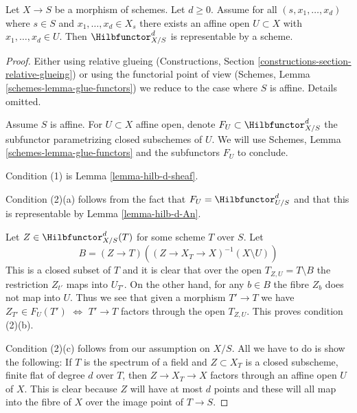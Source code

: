 \begin{proposition}
\label{proposition-hilb-d-representable}
Let $X \to S$ be a morphism of schemes. Let $d \geq 0$. Assume
for all $(s, x_1, \ldots, x_d)$ where $s \in S$ and
$x_1, \ldots, x_d \in X_s$ there exists an affine open $U \subset X$
with $x_1, \ldots, x_d \in U$. Then $\Hilbfunctor^d_{X/S}$ is
representable by a scheme.
\end{proposition}

\begin{proof}
Either using relative glueing (Constructions, Section
\ref{constructions-section-relative-glueing}) or using
the functorial point of view
(Schemes, Lemma \ref{schemes-lemma-glue-functors})
we reduce to the case where $S$ is affine. Details omitted.

\medskip\noindent
Assume $S$ is affine. For $U \subset X$ affine open, denote
$F_U \subset \Hilbfunctor^d_{X/S}$ the subfunctor parametrizing
closed subschemes of $U$. We will use
Schemes, Lemma \ref{schemes-lemma-glue-functors}
and the subfunctors $F_U$ to conclude.

\medskip\noindent
Condition (1) is Lemma \ref{lemma-hilb-d-sheaf}.

\medskip\noindent
Condition (2)(a) follows from the fact that
$F_U = \Hilbfunctor^d_{U/S}$ and that this is representable
by Lemma \ref{lemma-hilb-d-An}.

\medskip\noindent
Let $Z \in \Hilbfunctor^d_{X/S}(T)$ for some scheme $T$ over $S$. Let
$$
B = (Z \to T)\left((Z \to X_T \to X)^{-1}(X \setminus U)\right)
$$
This is a closed subset of $T$ and it is clear that over the open
$T_{Z, U} = T \setminus B$ the restriction $Z_{t'}$ maps into $U_{T'}$.
On the other hand, for any $b \in B$ the fibre $Z_b$ does not map
into $U$. Thus we see that given a morphism $T' \to T$ we
have $Z_{T'} \in F_U(T')$ $\Leftrightarrow$ $T' \to T$ factors through
the open $T_{Z, U}$. This proves condition (2)(b).

\medskip\noindent
Condition (2)(c) follows from our assumption on $X/S$. All we have
to do is show the following: If $T$ is the spectrum of a field
and $Z \subset X_T$ is a closed subscheme, finite flat of degree
$d$ over $T$, then $Z \to X_T \to X$ factors through an affine open
$U$ of $X$. This is clear because $Z$ will have at most $d$ points
and these will all map into the fibre of $X$ over the image point
of $T \to S$.
\end{proof}

